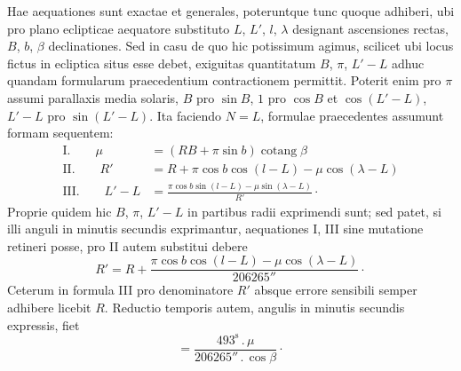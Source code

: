 Hae aequationes sunt exactae et generales, poteruntque tunc quoque adhiberi, ubi pro plano eclipticae aequatore substituto $L$, $L'$, $l$, $\lambda$ designant ascensiones rectas, $B$, $b$, $\beta$ declinationes. Sed in casu de quo hic potissimum agimus, scilicet ubi locus fictus in ecliptica situs esse debet, exiguitas quantitatum $B$, $\pi$, $L'-L$ adhuc quandam formularum praecedentium contractionem permittit. Poterit enim pro $\pi$ assumi parallaxis media solaris, $B$ pro $\sin B$, $1$ pro $\cos B$ et $\cos(L'-L)$, $L'-L$ pro $\sin(L'-L)$. Ita faciendo $N=L$, formulae praecedentes assumunt formam sequentem:
\[
\begin{aligned}
\mathrm{I.}\qquad \mu&=(RB+\pi\sin b)\operatorname{cotang}\beta\\
\mathrm{II.}\qquad R'&=R+\pi\cos b\cos(l-L)-\mu\cos(\lambda-L)\\
\mathrm{III.}\qquad L'-L&=\frac{\pi\cos b\sin(l-L)-\mu\sin(\lambda-L)}{R'}\mathpunct{\cdot}
\end{aligned}
\]
Proprie quidem hic $B$, $\pi$, $L'-L$ in partibus radii exprimendi sunt; sed patet, si illi anguli in minutis secundis exprimantur, aequationes I, III sine mutatione retineri posse, pro II autem substitui debere
\[
R'=R+\frac{\pi\cos b\cos(l-L)-\mu\cos(\lambda-L)}{206265''}\mathpunct{\cdot}
\]
Ceterum in formula III pro denominatore $R'$ absque errore sensibili semper adhibere licebit $R$. Reductio temporis autem, angulis in minutis secundis expressis, fiet
\[
=\frac{493^{\mathrm{s}}\mathpunct{.}\mu}{206265''\mathpunct{.}\cos\beta}\mathpunct{\cdot}
\]

